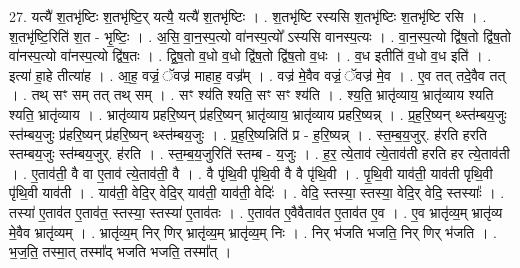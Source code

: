 \documentclass[17pt]{extarticle}
\begin{document}
27. यत्यै॑ श॒तभृ॑ष्टिः श॒तभृ॑ष्टि॒र् यत्यै॒ यत्यै॑ श॒तभृ॑ष्टिः । . श॒तभृ॑ष्टि रस्यसि श॒तभृ॑ष्टिः श॒तभृ॑ष्टि रसि । . श॒तभृ॑ष्टि॒रिति॑ श॒त - भृ॒ष्टिः॒ । . अ॒सि॒ वा॒न॒स्प॒त्यो वा॑नस्प॒त्यो᳚ ऽस्यसि वानस्प॒त्यः । . वा॒न॒स्प॒त्यो द्वि॑ष॒तो द्वि॑ष॒तो वा॑नस्प॒त्यो वा॑नस्प॒त्यो द्वि॑ष॒तः । . द्वि॒ष॒तो व॒धो व॒धो द्वि॑ष॒तो द्वि॑ष॒तो व॒धः । . व॒ध इतीति॑ व॒धो व॒ध इति॑ । . इत्या॑ हा॒हे तीत्या॑ह । . आ॒ह॒ वज्रं॒ ॅवज्र॑ माहाह॒ वज्र᳚म् । . वज्र॑ मे॒वैव वज्रं॒ ॅवज्र॑ मे॒व । . ए॒व तत् तदे॒वैव तत् । . तथ् सꣳ सम् तत् तथ् सम् । . सꣳ श्य॑ति श्यति॒ सꣳ सꣳ श्य॑ति । . श्य॒ति॒ भ्रातृ॑व्याय॒ भ्रातृ॑व्याय श्यति श्यति॒ भ्रातृ॑व्याय । . भ्रातृ॑व्याय प्रहरि॒ष्यन् प्र॑हरि॒ष्यन् भ्रातृ॑व्याय॒ भ्रातृ॑व्याय प्रहरि॒ष्यन्न् । . प्र॒ह॒रि॒ष्यन् थ्स्त॑म्बय॒जुः स्त॑म्बय॒जुः प्र॑हरि॒ष्यन् प्र॑हरि॒ष्यन् थ्स्त॑म्बय॒जुः । . प्र॒ह॒रि॒ष्यन्निति॑ प्र - ह॒रि॒ष्यन्न् । . स्त॒म्ब॒य॒जुर्. ह॑रति हरति स्तम्बय॒जुः स्त॑म्बय॒जुर्. ह॑रति । . स्त॒म्ब॒य॒जुरिति॑ स्तम्ब - य॒जुः । . ह॒र॒ त्ये॒ताव॑ त्ये॒ताव॑ती हरति हर त्ये॒ताव॑ती । . ए॒ताव॑ती॒ वै वा ए॒ताव॑ त्ये॒ताव॑ती॒ वै । . वै पृ॑थि॒वी पृ॑थि॒वी वै वै पृ॑थि॒वी । . पृ॒थि॒वी याव॑ती॒ याव॑ती पृथि॒वी पृ॑थि॒वी याव॑ती । . याव॑ती॒ वेदि॒र् वेदि॒र् याव॑ती॒ याव॑ती॒ वेदिः॑ । . वेदि॒ स्तस्या॒ स्तस्या॒ वेदि॒र् वेदि॒ स्तस्याः᳚ । . तस्या॑ ए॒ताव॑त ए॒ताव॑त॒ स्तस्या॒ स्तस्या॑ ए॒ताव॑तः । . ए॒ताव॑त ए॒वैवैताव॑त ए॒ताव॑त ए॒व । . ए॒व भ्रातृ॑व्य॒म् भ्रातृ॑व्य मे॒वैव भ्रातृ॑व्यम् । . भ्रातृ॑व्य॒म् निर् णिर् भ्रातृ॑व्य॒म् भ्रातृ॑व्य॒म् निः । . निर् भ॑जति भजति॒ निर् णिर् भ॑जति । . भ॒ज॒ति॒ तस्मा॒त् तस्मा᳚द् भजति भजति॒ तस्मा᳚त् । \newline
\end{document}
